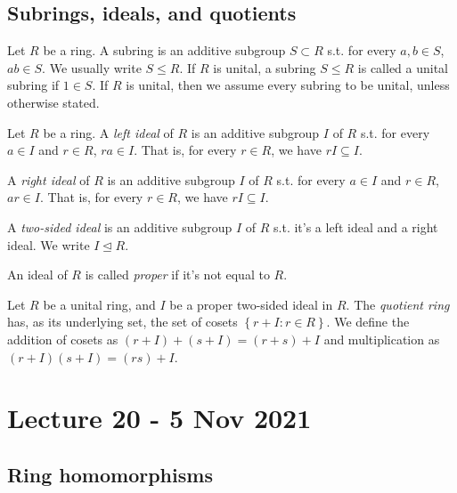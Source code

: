 \documentclass[11pt]{scrartcl}
\begin{document}
\subsection{Subrings, ideals, and quotients}

\begin{definition}
  Let $R$ be a ring. A subring is an additive subgroup $S\subset R$ s.t. for every
  $a,b\in S$, $ab\in S$. We usually write $S\leq R$. If $R$ is unital, a subring $S\leq R$
  is called a unital subring if $1\in S$. If $R$ is unital, then we assume every subring
  to be unital, unless otherwise stated.
  \label{<+label+>}
\end{definition}

\begin{definition}
  Let $R$ be a ring. A \emph{left ideal} of $R$ is an additive subgroup $I$ of $R$ s.t.
  for every $a\in I$ and $r\in R$, $ra\in I$. That is, for every $r\in R$, we have
  $rI\subseteq I$.

  A \emph{right ideal} of $R$ is an additive subgroup $I$ of $R$ s.t. for every $a\in I$
  and $r\in R$, $ar\in I$. That is, for every $r\in R$, we have $rI\subseteq I$.

  A \emph{two-sided ideal} is an additive subgroup $I$ of $R$ s.t. it's a left ideal and a
  right ideal. We write $I\trianglelefteq R$.

  An ideal of $R$ is called \emph{proper} if it's not equal to $R$.
  \label{<+label+>}
\end{definition}

\begin{definition}
  Let $R$ be a unital ring, and $I$ be a proper two-sided ideal in $R$. The
  \emph{quotient ring} has, as its underlying set, the set of cosets $\left\{ r+I : r\in R
  \right\}$. We define the addition of cosets as $(r+I)+(s+I)=(r+s)+I$ and multiplication
  as $(r+I)(s+I)=(rs)+I$.
  \label{<+label+>}
\end{definition}

\section{Lecture 20 - 5 Nov 2021}

\subsection{Ring homomorphisms}
\end{document}
